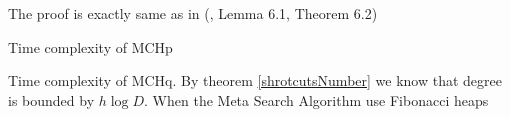 The proof is exactly same as in (\cite{abraham2016highway}, Lemma 6.1, Theorem 6.2)

Time complexity of MCHp 

Time complexity of MCHq. By theorem \ref{shrotcutsNumber} we know that degree is 
bounded by $h \log D$. When the Meta Search Algorithm use Fibonacci heaps  





